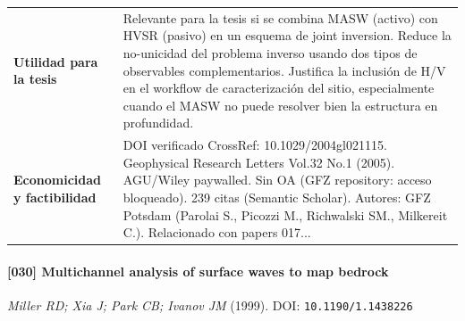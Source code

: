 \begin{center}
\begin{tabularx}{\textwidth}{@{}>{\bfseries}p{3.3cm} X@{}}
Utilidad para la tesis & Relevante para la tesis si se combina MASW (activo) con HVSR (pasivo) en un esquema de joint inversion. Reduce la no-unicidad del problema inverso usando dos tipos de observables complementarios. Justifica la inclusión de H/V en el workflow de caracterización del sitio, especialmente cuando el MASW no puede resolver bien la estructura en profundidad. \\
Economicidad y factibilidad & DOI verificado CrossRef: 10.1029/2004gl021115. Geophysical Research Letters Vol.32 No.1 (2005). AGU/Wiley paywalled. Sin OA (GFZ repository: acceso bloqueado). 239 citas (Semantic Scholar). Autores: GFZ Potsdam (Parolai S., Picozzi M., Richwalski SM., Milkereit C.). Relacionado con papers 017... \\
\bottomrule
\end{tabularx}
\end{center}

\paragraph{[030] Multichannel analysis of surface waves to map bedrock} \emph{Miller RD; Xia J; Park CB; Ivanov JM} (1999).
{\scriptsize DOI: \texttt{10.1190/1.1438226}}

